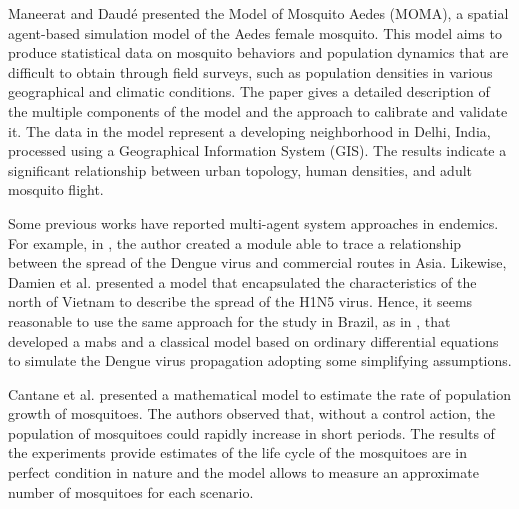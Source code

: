 Maneerat and Daudé \cite{maneerat:2016} presented the Model of Mosquito Aedes
(MOMA), a spatial agent-based simulation model of the Aedes female mosquito.
This model aims to produce statistical data on mosquito behaviors and population
dynamics that are difficult to obtain through field surveys, such as population
densities in various geographical and climatic conditions. The paper gives a
detailed description of the multiple components of the model and the approach to
calibrate and validate it. The data in the model represent a developing
neighborhood in Delhi, India, processed using a Geographical Information System
(GIS). The results indicate a significant relationship between urban topology,
human densities, and adult mosquito flight.

Some previous works have reported multi-agent system approaches in endemics. For
example, in  \cite{amouroux:2008}, the author created a module able to trace a
relationship between the spread of the Dengue virus and commercial routes in
Asia. Likewise, Damien et al.  \cite{damien:2017} presented a model that
encapsulated the characteristics of the north of Vietnam to describe the spread
of the H1N5 virus. Hence, it seems reasonable to use the same approach for the
study in Brazil, as in \cite{da-silva:2020}, that developed a \gls{mabs} and a
classical model based on ordinary differential equations to simulate the Dengue
virus propagation adopting some simplifying assumptions.


Cantane et al. \cite{cantane:2015}  presented a  mathematical  model to
estimate  the rate  of population growth  of mosquitoes. The  authors observed
that, without  a control action, the  population of mosquitoes  could rapidly
increase in  short periods. The  results of  the experiments  provide  estimates
of  the life  cycle of  the mosquitoes are in perfect condition in nature and
the model allows to measure an approximate number of mosquitoes for each
scenario.

